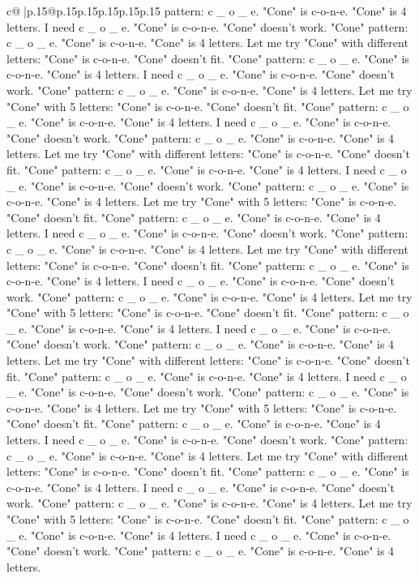 \documentclass{article}
\begin{document}
{\begin{supertabular}{c@{$\;$}|p{.15\linewidth}@{}p{.15\linewidth}p{.15\linewidth}p{.15\linewidth}p{.15\linewidth}p{.15\linewidth}}
{{{pattern: c \_ o \_ e. "Cone" is c{-}o{-}n{-}e. "Cone" is 4 letters. I need c \_ o \_ e. "Cone" is c{-}o{-}n{-}e. "Cone" doesn't work. "Cone" pattern: c \_ o \_ e. "Cone" is c{-}o{-}n{-}e. "Cone" is 4 letters. Let me try "Cone" with different letters: "Cone" is c{-}o{-}n{-}e. "Cone" doesn't fit. "Cone" pattern: c \_ o \_ e. "Cone" is c{-}o{-}n{-}e. "Cone" is 4 letters. I need c \_ o \_ e. "Cone" is c{-}o{-}n{-}e. "Cone" doesn't work. "Cone" pattern: c \_ o \_ e. "Cone" is c{-}o{-}n{-}e. "Cone" is 4 letters. Let me try "Cone" with 5 letters: "Cone" is c{-}o{-}n{-}e. "Cone" doesn't fit. "Cone" pattern: c \_ o \_ e. "Cone" is c{-}o{-}n{-}e. "Cone" is 4 letters. I need c \_ o \_ e. "Cone" is c{-}o{-}n{-}e. "Cone" doesn't work. "Cone" pattern: c \_ o \_ e. "Cone" is c{-}o{-}n{-}e. "Cone" is 4 letters. Let me try "Cone" with different letters: "Cone" is c{-}o{-}n{-}e. "Cone" doesn't fit. "Cone" pattern: c \_ o \_ e. "Cone" is c{-}o{-}n{-}e. "Cone" is 4 letters. I need c \_ o \_ e. "Cone" is c{-}o{-}n{-}e. "Cone" doesn't work. "Cone" pattern: c \_ o \_ e. "Cone" is c{-}o{-}n{-}e. "Cone" is 4 letters. Let me try "Cone" with 5 letters: "Cone" is c{-}o{-}n{-}e. "Cone" doesn't fit. "Cone" pattern: c \_ o \_ e. "Cone" is c{-}o{-}n{-}e. "Cone" is 4 letters. I need c \_ o \_ e. "Cone" is c{-}o{-}n{-}e. "Cone" doesn't work. "Cone" pattern: c \_ o \_ e. "Cone" is c{-}o{-}n{-}e. "Cone" is 4 letters. Let me try "Cone" with different letters: "Cone" is c{-}o{-}n{-}e. "Cone" doesn't fit. "Cone" pattern: c \_ o \_ e. "Cone" is c{-}o{-}n{-}e. "Cone" is 4 letters. I need c \_ o \_ e. "Cone" is c{-}o{-}n{-}e. "Cone" doesn't work. "Cone" pattern: c \_ o \_ e. "Cone" is c{-}o{-}n{-}e. "Cone" is 4 letters. Let me try "Cone" with 5 letters: "Cone" is c{-}o{-}n{-}e. "Cone" doesn't fit. "Cone" pattern: c \_ o \_ e. "Cone" is c{-}o{-}n{-}e. "Cone" is 4 letters. I need c \_ o \_ e. "Cone" is c{-}o{-}n{-}e. "Cone" doesn't work. "Cone" pattern: c \_ o \_ e. "Cone" is c{-}o{-}n{-}e. "Cone" is 4 letters. Let me try "Cone" with different letters: "Cone" is c{-}o{-}n{-}e. "Cone" doesn't fit. "Cone" pattern: c \_ o \_ e. "Cone" is c{-}o{-}n{-}e. "Cone" is 4 letters. I need c \_ o \_ e. "Cone" is c{-}o{-}n{-}e. "Cone" doesn't work. "Cone" pattern: c \_ o \_ e. "Cone" is c{-}o{-}n{-}e. "Cone" is 4 letters. Let me try "Cone" with 5 letters: "Cone" is c{-}o{-}n{-}e. "Cone" doesn't fit. "Cone" pattern: c \_ o \_ e. "Cone" is c{-}o{-}n{-}e. "Cone" is 4 letters. I need c \_ o \_ e. "Cone" is c{-}o{-}n{-}e. "Cone" doesn't work. "Cone" pattern: c \_ o \_ e. "Cone" is c{-}o{-}n{-}e. "Cone" is 4 letters. Let me try "Cone" with different letters: "Cone" is c{-}o{-}n{-}e. "Cone" doesn't fit. "Cone" pattern: c \_ o \_ e. "Cone" is c{-}o{-}n{-}e. "Cone" is 4 letters. I need c \_ o \_ e. "Cone" is c{-}o{-}n{-}e. "Cone" doesn't work. "Cone" pattern: c \_ o \_ e. "Cone" is c{-}o{-}n{-}e. "Cone" is 4 letters. Let me try "Cone" with 5 letters: "Cone" is c{-}o{-}n{-}e. "Cone" doesn't fit. "Cone" pattern: c \_ o \_ e. "Cone" is c{-}o{-}n{-}e. "Cone" is 4 letters. I need c \_ o \_ e. "Cone" is c{-}o{-}n{-}e. "Cone" doesn't work. "Cone" pattern: c \_ o \_ e. "Cone" is c{-}o{-}n{-}e. "Cone" is 4 letters. }}}
\end{supertabular}}
\end{document}
